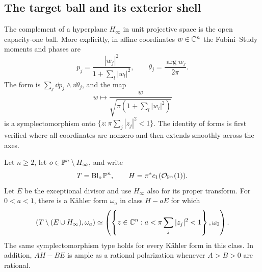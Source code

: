 \subsection{The target ball and its exterior shell}

The complement of a hyperplane \(H_\infty\) in unit projective
space is the open capacity-one ball. More explicitly, in affine
coordinates \(w\in\mathbb C^n\) the Fubini--Study moments and phases are
\[
 p_j=\frac{|w_j|^2}{1+\sum_l|w_l|^2},\qquad
 \theta_j=\frac{\arg w_j}{2\pi}.
\]
The form is \(\sum_j\dd p_j\wedge\dd\theta_j\), and the map
\begin{equation}\label{geo:affine-ball}
 w\longmapsto
 \frac{w}{\sqrt{\pi(1+\sum_l|w_l|^2)}}
\end{equation}
is a symplectomorphism onto
\(\{z:\pi\sum_j|z_j|^2<1\}\). The identity of forms is first
verified where all coordinates are nonzero and then extends
smoothly across the axes.

\begin{lemma}\label{geo:shell}
Let \(n\ge2\), let \(o\in\mathbb P^n\setminus H_\infty\), and write
\[
 T=\operatorname{Bl}_o\mathbb P^n,\qquad H=\pi^*c_1(\mathcal O_{\mathbb P^n}(1)).
\]
Let \(E\) be the exceptional divisor and use \(H_\infty\) also
for its proper transform. For \(0<a<1\), there is a K\"ahler
form \(\omega_a\) in class \(H-aE\) for which
\[
 (T\setminus(E\cup H_\infty),\omega_a)
 \simeq
 \left(\left\{z\in\mathbb C^n:
 a<\pi\sum_j|z_j|^2<1\right\},\omega_0\right).
\]
The same symplectomorphism type holds for every K\"ahler form
in this class. In addition, \(AH-BE\) is ample as a rational
polarization whenever \(A>B>0\) are rational.
\end{lemma}

